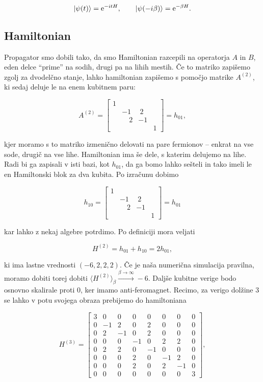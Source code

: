 \documentclass[a4 paper, 12pt]{article}
\begin{document}
\[
	|\psi(t)\rangle = \text{e}^{-itH}, \qquad |\psi(-i\beta)\rangle = \text{e}^{-\beta H}.
\]

\subsection{Hamiltonian}

Propagator smo dobili tako, da smo Hamiltonian razcepili na operatorja $A$ in $B$, eden delce "`prime"' na sodih,
drugi pa na lihih mestih. Če to matriko zapišemo zgolj za dvodelčno stanje, lahko hamiltonian zapišemo s pomočjo
matrike $A^{(2)}$, ki sedaj deluje le na enem kubitnem paru:

\[
	A^{(2)} = \begin{bmatrix}
		1 &  &  &  \\
		&-1 &\ 2 &  \\
		 & \quad 2 & -1 &  \\
		 &  &  & 1
		\end{bmatrix} = h_{01},
\]

kjer moramo s to matriko izmenično delovati na pare fermionov -- enkrat na vse sode, drugič na vse lihe. Hamiltonian
ima še dele, s katerim delujemo na lihe. Radi bi ga zapisali v isti bazi, kot $h_{01}$, da ga bomo lahko sešteli
in tako imeli le en Hamiltonski blok za dva kubita. Po izračunu dobimo

\[
	h_{10} =  \begin{bmatrix}
		1 &  &  &  \\
		&-1 &\ 2 &  \\
		 & \quad 2 & -1 &  \\
		 &  &  & 1
		\end{bmatrix} = h_{01}
\]

kar lahko z nekaj algebre potrdimo. Po definiciji mora veljati

\begin{equation}
	H^{(2)} = h_{01} + h_{10} = 2h_{01},
\end{equation}

ki ima lastne vrednosti $(-6, 2, 2, 2)$.
Če je naša numerična simulacija pravilna, moramo dobiti torej dobiti $\langle H^{(2)} \rangle_\beta
\stackrel{\beta \to \infty}{\longrightarrow} -6$. Daljše kubitne verige bodo osnovno skalirale proti 0, ker imamo
anti-feromagnet. Recimo, za verigo dolžine $3$ se lahko v potu svojega obraza prebijemo do hamiltoniana

\begin{equation}
	H^{(3)} = \begin{bmatrix}
	3 & 0 & 0 & 0 & 0 & 0 & 0 & 0 \\
	0 & -1 & 2 & 0 & 2 & 0 & 0 & 0 \\
	0 & 2 & -1 & 0 & 2 & 0 & 0 & 0 \\
	0 & 0 & 0 & -1 & 0 & 2 & 2 & 0 \\
	0 & 2 & 2 & 0 & -1 & 0 & 0 & 0 \\
	0 & 0 & 0 & 2 & 0 & -1 & 2 & 0 \\
	0 & 0 & 0 & 2 & 0 & 2 & -1 & 0 \\
	0 & 0 & 0 & 0 & 0 & 0 & 0 & 3
	\end{bmatrix},
\end{equation}
\end{document}
